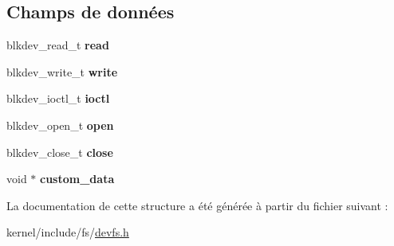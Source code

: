 \subsection*{\-Champs de données}
\begin{DoxyCompactItemize}
\item 
\hypertarget{structblkdev__interfaces_ad14a2ad714105cdb8ce002eb4fb9e747}{blkdev\-\_\-read\-\_\-t {\bfseries read}}\label{structblkdev__interfaces_ad14a2ad714105cdb8ce002eb4fb9e747}

\item 
\hypertarget{structblkdev__interfaces_ae99fb7e1529ef6c24df9dc454bc0f9f6}{blkdev\-\_\-write\-\_\-t {\bfseries write}}\label{structblkdev__interfaces_ae99fb7e1529ef6c24df9dc454bc0f9f6}

\item 
\hypertarget{structblkdev__interfaces_ae93720624e6f1a1ea33e31bf1da4c097}{blkdev\-\_\-ioctl\-\_\-t {\bfseries ioctl}}\label{structblkdev__interfaces_ae93720624e6f1a1ea33e31bf1da4c097}

\item 
\hypertarget{structblkdev__interfaces_a08eaa39b105826d2780991b32577867a}{blkdev\-\_\-open\-\_\-t {\bfseries open}}\label{structblkdev__interfaces_a08eaa39b105826d2780991b32577867a}

\item 
\hypertarget{structblkdev__interfaces_ab7623005e31211894853b3524e1e74eb}{blkdev\-\_\-close\-\_\-t {\bfseries close}}\label{structblkdev__interfaces_ab7623005e31211894853b3524e1e74eb}

\item 
\hypertarget{structblkdev__interfaces_a8eea79e70042c41cc171796b501a9fd1}{void $\ast$ {\bfseries custom\-\_\-data}}\label{structblkdev__interfaces_a8eea79e70042c41cc171796b501a9fd1}

\end{DoxyCompactItemize}


\-La documentation de cette structure a été générée à partir du fichier suivant \-:\begin{DoxyCompactItemize}
\item 
kernel/include/fs/\hyperlink{devfs_8h}{devfs.\-h}\end{DoxyCompactItemize}

